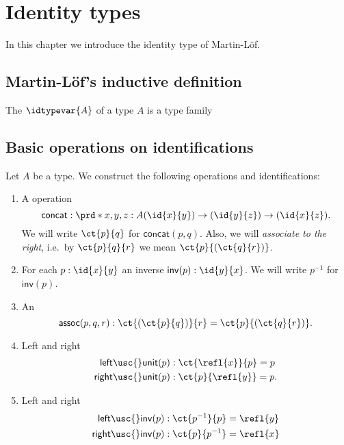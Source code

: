 \chapter{Identity types}
In this chapter we introduce the identity type of Martin-L\"of. 

\section{Martin-L\"of's inductive definition}
\begin{defn}
The  $\idtypevar{A}$ of a type $A$ is a type family
\end{defn}

\section{Basic operations on identifications}\label{sec:groupoid}
\begin{defn}\label{defn:groupoid}
Let $A$ be a type. We construct the following operations and identifications:
\begin{enumerate}
\item A  operation
\begin{equation*}
\mathsf{concat} : \prd*{x,y,z:A} (\id{x}{y})\to(\id{y}{z})\to (\id{x}{z}).
\end{equation*}
We will write $\ct{p}{q}$ for $\mathsf{concat}(p,q)$. Also, we will \emph{associate to the right}, i.e.~by $\ct{p}{q}{r}$ we mean $\ct{p}{(\ct{q}{r})}$.
\item For each $p:\id{x}{y}$ an inverse $\mathsf{inv}(p):\id{y}{x}$. We will write $p^{-1}$ for $\mathsf{inv}(p)$.
\item An 
\begin{equation*}
\mathsf{assoc}(p,q,r) : \ct{(\ct{p}{q})}{r}=\ct{p}{(\ct{q}{r})}.
\end{equation*}
\item Left and right 
\begin{align*}
\mathsf{left\usc{}unit}(p) & : \ct{\refl{x}}{p}=p \\
\mathsf{right\usc{}unit}(p) & : \ct{p}{\refl{y}}=p.
\end{align*}
\item Left and right 
\begin{align*}
\mathsf{left\usc{}inv}(p) & : \ct{p^{-1}}{p} = \refl{y} \\
\mathsf{right\usc{}inv}(p) & : \ct{p}{p^{-1}} = \refl{x}
\end{align*}
\end{enumerate}
\end{defn}

